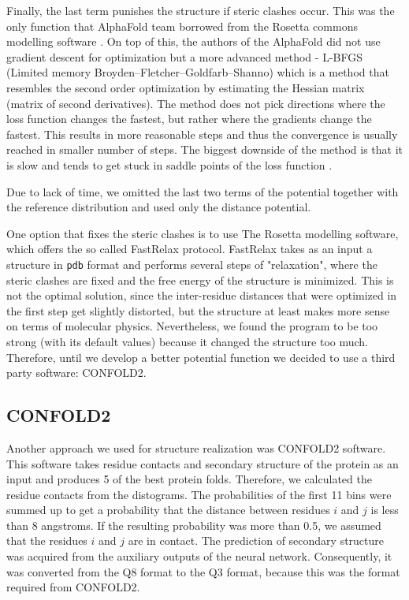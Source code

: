 Finally, the last term punishes the structure if steric clashes occur. This was the only function that AlphaFold team borrowed from the Rosetta commons modelling software \cite{rosettacommons}. On top of this, the authors of the AlphaFold did not use gradient descent for optimization but a more advanced method - L-BFGS (Limited memory Broyden–Fletcher–Goldfarb–Shanno) which is a method that resembles the second order optimization by estimating the Hessian matrix (matrix of second derivatives). The method does not pick directions where the loss function changes the fastest, but rather where the gradients change the fastest. This results in more reasonable steps and thus the convergence is usually reached in smaller number of steps. The biggest downside of the method is that it is slow and tends to get stuck in saddle points of the loss function \cite{nn_dl}.

Due to lack of time, we omitted the last two terms of the potential together with the reference distribution and used only the distance potential. 

One option that fixes the steric clashes is to use The Rosetta modelling software, which offers the so called FastRelax protocol. 
FastRelax takes as an input a structure in \texttt{pdb} format and performs several steps of "relaxation", where the steric clashes are fixed and the free energy of the structure is minimized. 
This is not the optimal solution, since the inter-residue distances that were optimized in the first step get slightly distorted, but the structure at least makes more sense on terms of molecular physics. 
Nevertheless, we found the program to be too strong (with its default values) because it changed the structure too much.
Therefore, until we develop a better potential function we decided to use a third party software: CONFOLD2. 

\subsection{CONFOLD2}
Another approach we used for structure realization was CONFOLD2 software.
This software takes residue contacts and secondary structure of the protein as an input and produces 5 of the best protein folds.
Therefore, we calculated the residue contacts from the distograms.
The probabilities of the first 11 bins were summed up to get a probability that the distance between residues $i$ and $j$ is less than 8 angstroms.
If the resulting probability was more than 0.5, we assumed that the residues $i$ and $j$ are in contact.
The prediction of secondary structure was acquired from the auxiliary outputs of the neural network.
Consequently, it was converted from the Q8 format to the Q3 format, because this was the format required from CONFOLD2.

